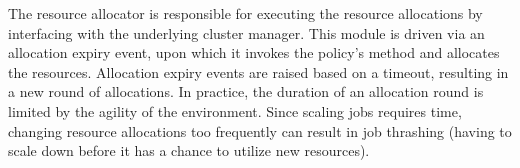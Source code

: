 



The resource allocator is responsible for executing the resource allocations by interfacing with the
underlying cluster manager.
This module is driven via an
allocation expiry event, upon which it invokes the policy's \getalloc{} method and allocates the
resources. Allocation expiry events are raised based on a timeout,
resulting in a new round of allocations.
In practice, the duration of an allocation round
is limited by the agility of the environment. Since scaling jobs requires time, changing
resource allocations too frequently can result in job thrashing (having to scale down before it has
a chance to utilize new resources).

